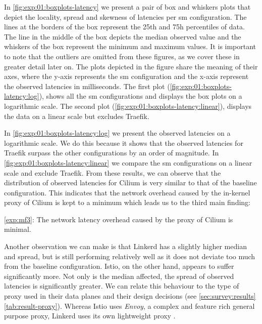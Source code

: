 In \cref{fig:exp:01:boxplots-latency} we present a pair of box and whiskers plots that depict the locality, spread and skewness of latencies per \gls{sm} configuration. The lines at the borders of the box represent the 25th and 75h percentiles of data. The line in the middle of the box depicts the median observed value and the whiskers of the box represent the minimum and maximum values. It is important to note that the outliers are omitted from these figures, as we cover these in greater detail later on. The plots depicted in the figure share the meaning of their axes, where the y-axis represents the \gls{sm} configuration and the x-axis represent the observed latencies in milliseconds. The first plot (\cref{fig:exp:01:boxplots-latency:log}), shows all the \gls{sm} configurations and displays the box plots on a logarithmic scale. The second plot (\cref{fig:exp:01:boxplots-latency:linear}), displays the data on a linear scale but excludes Traefik.

In \cref{fig:exp:01:boxplots-latency:log} we present the observed latencies on a logarithmic scale. We do this because it shows that the observed latencies for Traefik surpass the other configurations by an order of magnitude. In \cref{fig:exp:01:boxplots-latency:linear} we compare the \gls{sm} configurations on a linear scale and exclude Traefik. From these results, we can observe that the distribution of observed latencies for Cilium is very similar to that of the baseline configuration. This indicates that the network overhead caused by the in-kernel proxy of Cilium is kept to a minimum which leads us to the third main finding:

\begin{shaded*}
    \noindent
    \ref{exp:mf3}: 
    The network latency overhead caused by the proxy of Cilium is minimal.
\end{shaded*}

Another observation we can make is that Linkerd has a slightly higher median and spread, but is still performing relatively well as it does not deviate too much from the baseline configuration. Istio, on the other hand, appears to suffer significantly more. Not only is the median affected, the spread of observed latencies is significantly greater. We can relate this behaviour to the type of proxy used in their data planes and their design decisions (see \cref{sec:survey:results} \cref{tab:result-proxy}). Whereas Istio uses \textit{Envoy}, a complex and feature rich general purpose proxy, Linkerd uses its own lightweight proxy \cite{linkerd-no-envoy}.


